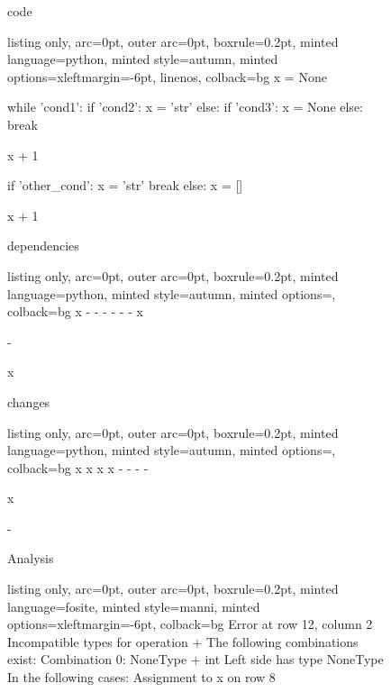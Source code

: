 \begin{figure}[!h]
 \begin{minipage}{0.32\textwidth}
 code
 \vspace{2pt}
  \begin{tcblisting}{listing only, 
    arc=0pt,
    outer arc=0pt, 
    boxrule=0.2pt,
    minted language=python,
    minted style=autumn,
    minted options={xleftmargin=-6pt, linenos},
    colback=bg }
x = None

while 'cond1': 
  if 'cond2': 
    x = 'str'
  else:
    if 'cond3':
      x = None
    else:
      break

  x + 1

  if 'other_cond':
    x = 'str'
    break
  else:
    x = []

x + 1
\end{tcblisting}
 \end{minipage}
 \begin{minipage}{0.32\textwidth}
 dependencies
  \begin{tcblisting}{listing only, 
    arc=0pt,
    outer arc=0pt, 
    boxrule=0.2pt,
    minted language=python,
    minted style=autumn,
    minted options={},
    colback=bg }
x
-
-
-
-
-
-
x

-

x
\end{tcblisting}
 \end{minipage}
 \begin{minipage}{0.32\textwidth}
 changes
  \begin{tcblisting}{listing only, 
    arc=0pt,
    outer arc=0pt, 
    boxrule=0.2pt,
    minted language=python,
    minted style=autumn,
    minted options={},
    colback=bg }
x
x
x
x
-
-
-
-

x

-
\end{tcblisting}
 \end{minipage}
 \begin{minipage}{\textwidth}
  \vspace{4pt}
 \begin{minipage}{0.5\textwidth}
 \vspace{-148pt}
 Analysis
  \begin{tcblisting}{listing only, 
    arc=0pt,
    outer arc=0pt, 
    boxrule=0.2pt,
    minted language=fosite,
    minted style=manni,
    minted options={xleftmargin=-6pt},
    colback=bg }
Error at row 12, column 2
 Incompatible types for operation +
 The following combinations exist:
 Combination 0: NoneType + int
  Left side has type NoneType
  In the following cases:
   Assignment to x on row 8


\end{tcblisting}
\end{minipage}
\end{minipage}
\end{figure}
